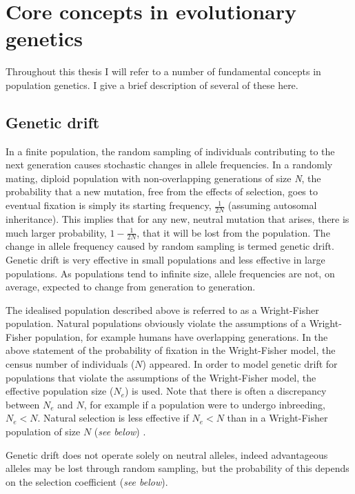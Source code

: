 \section[Core concepts]{Core concepts in evolutionary genetics}

	Throughout this thesis I will refer to a number of fundamental concepts in population genetics. I give a brief description of several of these here.

\subsection{Genetic drift}

	In a finite population, the random sampling of individuals contributing to the next generation causes stochastic changes in allele frequencies. In a randomly mating, diploid population with non-overlapping generations of size \textit{N}, the probability that a new mutation, free from the effects of selection, goes to eventual fixation is simply its starting frequency, $\frac{1}{2N}$ (assuming autosomal inheritance). This implies that for any new, neutral mutation that arises, there is much larger probability, $1 - \frac{1}{2N}$, that it will be lost from the population. The change in allele frequency caused by random sampling is termed genetic drift. Genetic drift is very effective in small populations and less effective in large populations. As populations tend to infinite size, allele frequencies are not, on average, expected to change from generation to generation.
	
	The idealised population described above is referred to as a Wright-Fisher population. Natural populations obviously violate the assumptions of a Wright-Fisher population, for example humans have overlapping generations. In the above statement of the probability of fixation in the Wright-Fisher model, the census number of individuals ($N$) appeared. In order to model genetic drift for populations that violate the assumptions of the Wright-Fisher model, the effective population size ($N_e$) is used. Note that there is often a discrepancy between $N_e$ and $N$, for example if a population were to undergo inbreeding, $N_e < N$. Natural selection is less effective if $N_e < N$ than in a Wright-Fisher population of size $N$ (\textit{see below}) \cite{RN110}.

	Genetic drift does not operate solely on neutral alleles, indeed advantageous alleles may be lost through random sampling, but the probability of this depends on the selection coefficient (\textit{see below}).
	
